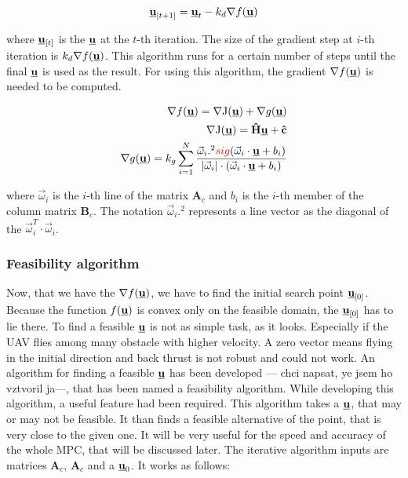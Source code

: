 \documentclass[a4paper,11pt,titlepage]{article}
\newcommand{\uvec}{\textbf{\underline{u}}}
\newcommand{\macJ}{\mathrm{J}(\uvec)}
\newcommand{\macf}{f(\uvec)}
\newcommand{\macg}{g(\uvec)}
\newcommand{\macoi}{\vec{\omega}_i}
\begin{document}
\begin{equation}
\label{eq:gradient_descend}
\uvec_{[t+1]} = \uvec_{t} - k_d \nabla \macf 
\end{equation}

where $\uvec_{[t]}$ is the $\uvec$ at the $t$-th iteration. The size of the gradient step at $i$-th iteration is $k_d \nabla \macf$.  This algorithm runs for a certain number of steps until the final $\uvec$ is used as the result. For using this algorithm, the gradient $\nabla \macf$ is needed to be computed.

\begin{equation}
\begin{split}
\nabla \macf = \nabla \macJ + \nabla \macg\\
\nabla\macJ = \textbf{\^H}\uvec + \textbf{\^c}\\
\nabla \macg = k_g\sum_{i = 1}^N
\frac{\macoi.^2\textcolor{red}{sig}(\macoi\cdot\uvec+b_i)}
{|\macoi|\cdot(\macoi \cdot \uvec + b_i)}
\end{split}
\end{equation}

where $\macoi$ is the $i$-th line of the matrix $\textbf{A}_c$ and $b_i$ is the $i$-th member of the column matrix $\textbf{B}_c$. The notation $\macoi.^2$ represents a line vector as the diagonal of the $\macoi^T \cdot \macoi$. 

\subsubsection{Feasibility algorithm}
Now, that we have the $\nabla \macf$, we have to find the initial search point $\uvec_{[0]}$. Because the function $\macf$ is convex only on the feasible domain, the $\uvec_{[0]}$ has to lie there. To find a feasible $\uvec$ is not as simple task, as it looks. Especially if the UAV flies among many obstacle with higher velocity. A zero vector means flying in the initial direction and back thrust is not robust and could not work. An algorithm for finding a feasible $\uvec$ has been developed --- chci napsat, ye jsem ho vztvoril ja---, that has been named a feasibility algorithm. While developing this algorithm, a useful feature had been required. This algorithm takes a $\uvec$, that may or may not be feasible. It than finds a feasible alternative of the point, that is very close to the given one. It will be very useful for the speed and accuracy of the whole MPC, that will be discussed later. The iterative algorithm inputs are matrices $\textbf{A}_c$, $\textbf{A}_c$ and a $\uvec_0$. It works as follows:
\end{document}
